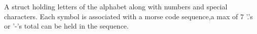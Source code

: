 A struct holding letters of the alphabet along with numbers and special characters. Each symbol is associated with a morse code sequence,a max of 7 '.'s or '-\/'s total can be held in the sequence. 